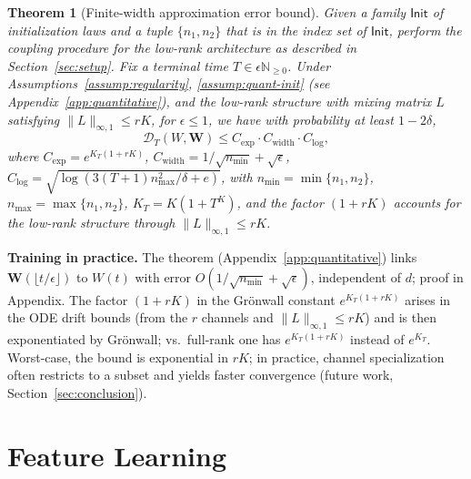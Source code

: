 \documentclass[nohyperref]{article}
\theoremstyle{plain}
\newtheorem{theorem}{Theorem}[section]
\theoremstyle{definition}
\theoremstyle{remark}
\begin{document}
\begin{theorem}[Finite-width approximation error bound]
\label{thm:quantitative-main}
Given a family $\mathsf{Init}$ of initialization laws and a tuple $\{n_1, n_2\}$ that is in the index set of $\mathsf{Init}$, perform the coupling procedure for the low-rank architecture as described in Section~\ref{sec:setup}. Fix a terminal time $T \in \epsilon\mathbb{N}_{\ge 0}$. Under Assumptions~\ref{assump:regularity}, \ref{assump:quant-init} (see Appendix~\ref{app:quantitative}), and the low-rank structure with mixing matrix $L$ satisfying $\|L\|_{\infty,1} \le rK$, for $\epsilon \le 1$, we have with probability at least $1-2\delta$,
\[
\mathscr{D}_T(W, \mathbf{W}) \le C_{\exp} \cdot C_{\text{width}} \cdot C_{\log},
\]
where $C_{\exp} = e^{K_T(1+rK)}$, $C_{\text{width}} = 1/\sqrt{n_{\min}} + \sqrt{\epsilon}$, $C_{\log} = \sqrt{\log(3(T+1)n_{\max}^2/\delta + e)}$, with $n_{\min} = \min\{n_1, n_2\}$, $n_{\max} = \max\{n_1, n_2\}$, $K_T = K(1+T^K)$, and the factor $(1+rK)$ accounts for the low-rank structure through $\|L\|_{\infty,1} \le rK$.


\end{theorem}

\textbf{Training in practice.} The theorem (Appendix~\ref{app:quantitative}) links $\mathbf{W}(\lfloor t/\epsilon\rfloor)$ to $W(t)$ with error $O(1/\sqrt{n_{\min}}+\sqrt{\epsilon})$, independent of $d$; proof in Appendix. The factor $(1+rK)$ in the Grönwall constant $e^{K_T(1+rK)}$ arises in the ODE drift bounds (from the $r$ channels and $\|L\|_{\infty,1}\le rK$) and is then exponentiated by Grönwall; vs.\ full-rank \cite{nguyen2023rigorousframeworkmeanfield} one has $e^{K_T(1+rK)}$ instead of $e^{K_T}$. Worst-case, the bound is exponential in $rK$; in practice, channel specialization often restricts to a subset and yields faster convergence (future work, Section~\ref{sec:conclusion}).























\section{Feature Learning}
\label{sec:channel-specialization}
\end{document}
